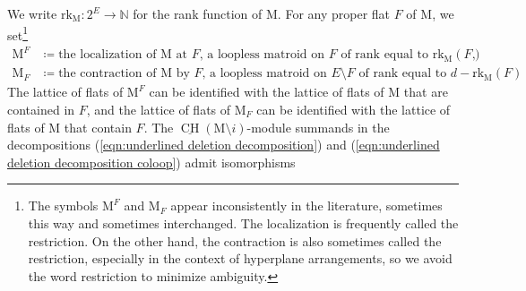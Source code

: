 \documentclass[11pt,reqno]{amsart}
\theoremstyle{definition}
\theoremstyle{remark}
\renewcommand{\(}{\left(}
\renewcommand{\)}{\right)}
\newcommand{\<}{\left<}
\renewcommand{\>}{\right>}
\newcommand{\CH}{\operatorname{CH}}
\renewcommand{\mid}{\hspace{0.3mm}|\hspace{0.3mm}}
\begin{document}
We write $\text{rk}_\mathrm{M}:2^E \to \mathbb{N}$ for the rank function of $\mathrm{M}$.
For any proper flat $F$ of $\mathrm{M}$, we set\footnote{The symbols $\mathrm{M}^F$ and $\mathrm{M}_F$
appear inconsistently in the literature, sometimes this way and sometimes interchanged.
The localization is frequently called the restriction.  On the other hand, the contraction is also sometimes called the restriction, especially in the context of hyperplane arrangements,
so we avoid the word restriction to minimize ambiguity.}
\begin{align*}
\mathrm{M}^F&\coloneq\text{the localization
 of $\mathrm{M}$ at $F$, a loopless matroid on $F$ of rank equal to $\text{rk}_\mathrm{M}(F)$},\\
\mathrm{M}_F&\coloneq\text{the contraction of $\mathrm{M}$ by $F$, a loopless matroid on $E \setminus F$  of rank equal to $d-\text{rk}_\mathrm{M}(F)$}.
\end{align*}
The lattice of flats of  $\mathrm{M}^F$ can be identified with the lattice of flats of $\mathrm{M}$ that are contained in $F$, 
and the lattice of flats of  $\mathrm{M}_F$ can be identified with the lattice of flats of $\mathrm{M}$ that contain $F$.
The  $\underline{\CH}(\mathrm{M} \setminus i)$-module summands in the decompositions  (\ref{eqn:underlined deletion decomposition})  and  (\ref{eqn:underlined deletion decomposition coloop}) admit isomorphisms 
\end{document}
